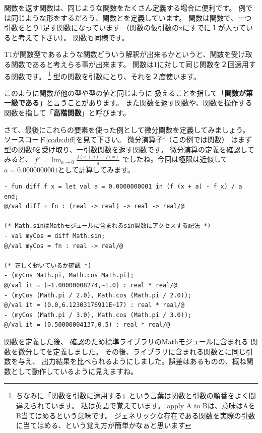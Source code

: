 \documentclass[11pt,a4paper]{jarticle}
\begin{document}
関数を返す関数は、同じような関数をたくさん定義する場合に便利です。
例では同じような形をするだろう、関数とを定義しています。
関数は関数で、一つ引数をとり1足す関数になっています
（関数の仮引数のxにすでに１が入っていると考えて下さい）。
関数も同様です。

T1が関数型であるような関数どういう解釈が出来るかというと、関数を受け取る関数であると考えらる事が出来ます。
関数は1に対して同じ関数を２回適用する関数です。
\footnote{
ちなみに「関数を引数に適用する」という言葉は関数と引数の順番をよく間違えられています。
私は英語で覚えています。
apply A to Bは、意味はAをB当てはめるという意味です。
ジェネリックな存在である関数を実際の引数に当てはめる、という覚え方が簡単かなぁと思います}
型の関数を引数にとり、それを２度使います。

このように関数が他の型や型の値と同じように
扱えることを指して「{\bfseries 関数が第一級である}」と言うことがあります。
また関数を返す関数や、関数を操作する関数を指して「{\bfseries 高階関数}」と呼びます。

さて、最後にこれらの要素を使った例として微分関数を定義してみましょう。
ソースコード\ref{code:diff}を見て下さい。
微分演算子$'$（この例では関数）
はまず型の関数fを受け取り、一引数関数を返す関数です。
微分演算の定義を確認してみると、
$f' = \lim_{a \to 0}\frac{f(x+a) - f(x)}{a}$
でしたね。今回は極限は近似して$a = 0.0000000001$として計算してみます。

\begin{lstlisting}[caption=高階関数の例,label=code:diff]
- fun diff f x = let val a = 0.0000000001 in (f (x + a) - f x) / a end;
@/val diff = fn : (real -> real) -> real -> real/@

(* Math.sinはMathモジュールに含まれるsin関数にアクセスする記法 *)
- val myCos = diff Math.sin;
@/val myCos = fn : real -> real/@

(* 正しく動いているか確認 *)
- (myCos Math.pi, Math.cos Math.pi);
@/val it = (~1.00000008274,~1.0) : real * real/@
- (myCos (Math.pi / 2.0), Math.cos (Math.pi / 2.0));
@/val it = (0.0,6.12303176911E~17) : real * real/@
- (myCos (Math.pi / 3.0), Math.cos (Math.pi / 3.0));
@/val it = (0.50000004137,0.5) : real * real/@
\end{lstlisting}

関数を定義した後、
確認のため標準ライブラリのMathモジュールに含まれる
関数を微分してを定義しました。
その後、ライブラリに含まれる関数とに同じ引数を与え、
出力結果を比べられるようにしました。誤差はあるものの、概ね関数として動作しているように見えますね。
\end{document}
